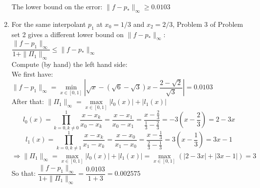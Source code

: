 \documentclass[14pt,a4paper]{article}
\begin{document}
\begin{enumerate}
	The lower bound on the error: $\|f-p_*\|_{\infty} \geq 0.0103$
	
	\label{1b}
	\item For the same interpolant $p_1$ at $x_0 = 1/3$ and $x_2 = 2/3$, Problem 3 of Problem set 2 gives a different lower bound on $\|f-p_*\|_{\infty}$:\\
	\hspace*{5cm} $\dfrac{\|f-p_1\|_{\infty}}{1 + \|\Pi_1\|_{\infty}} \leq \|f-p_*\|_{\infty}$ \\
	Compute (by hand) the left hand side:\\
	We first have: $\|f-p_1\|_{\infty} = \min\limits_{x\in [0,1]}\left| \sqrt{x} - \left( \sqrt{6}-\sqrt{3}\right)x - \dfrac{2 - \sqrt{2}}{\sqrt{3}} \right| = 0.0103$\\
	After that: $\|\Pi_1\|_{\infty} = \max\limits_{x \in [0,1]} |l_0(x)| + |l_1(x)|$\\
	$$ l_0(x) = \prod_{k=0,k\neq 0}^{1} \dfrac{x - x_k}{x_0-x_k} = \dfrac{x - x_1}{x_0 - x_1} = \dfrac{x - \frac{2}{3}}{\frac{1}{3} - \frac{2}{3}} = -3\left(x - \frac{2}{3} \right) = 2 - 3x $$
	$$ l_1(x) = \prod_{k=0,k\neq 1}^{1} \dfrac{x - x_k}{x_1-x_k} = \dfrac{x - x_0}{x_1 - x_0} = \dfrac{x - \frac{1}{3}}{\frac{2}{3} - \frac{1}{3}} = 3\left(x - \frac{1}{3} \right) = 3x-1 $$  
	$\Rightarrow \|\Pi_1\|_{\infty} = \max\limits_{x \in [0,1]} |l_0(x)| + |l_1(x)| = \max\limits_{x \in [0,1]} \left( |2-3x| + |3x-1|\right) = 3$\\
	So that: $\dfrac{\|f-p_1\|_{\infty}}{1 + \|\Pi_1\|_{\infty}} = \dfrac{0.0103}{1+3} = 0.002575$\\
	

\end{enumerate}
\end{document}
